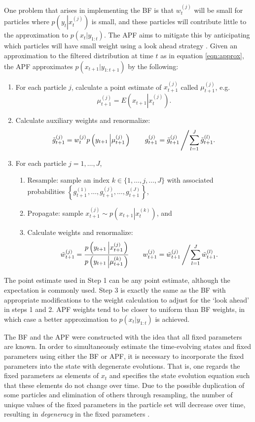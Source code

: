 One problem that arises in implementing the BF is that $w_t^{(j)}$ will be small for particles where $p\left(y_{t}\left|x_{t}^{(j)}\right.\right)$ is small, and these particles will contribute little to the approximation to $p(x_{t}|y_{1:t})$. The APF aims to mitigate this by anticipating which particles will have small weight using a look ahead strategy \citep{Pitt:Shep:filt:1999}. Given an approximation to the filtered distribution at time $t$ as in equation \eqref{eqn:approx}, the APF approximates $p(x_{t+1}|y_{1:t+1})$ by the following:
\begin{enumerate}
\item For each particle $j$, calculate a point estimate of $x_{t+1}^{(j)}$ called $\mu_{t+1}^{(j)}$, e.g.
\[ \mu_{t+1}^{(j)} = E\left(x_{t+1}\left|x_t^{(j)} \right.\right). \]
\item Calculate auxiliary weights and renormalize:
\[ \tilde{g}_{t+1}^{(j)} = w_t^{(j)} p\left(y_{t+1}\left|\mu_{t+1}^{(j)}\right.\right) \qquad g_{t+1}^{(j)} = \tilde{g}_{t+1}^{(j)}\left/\sum_{l=1}^J \tilde{g}_{t+1}^{(l)}.\right. \]
\item For each particle $j=1,\ldots,J$,
	\begin{enumerate}
    \item Resample: sample an index $k\in\{1,\ldots,j,\ldots,J\}$ with associated probabilities $\left\{g_{t+1}^{(1)},\ldots,g_{t+1}^{(j)},\ldots,g_{t+1}^{(J)}\right\}$,
	\item Propagate: sample $x_{t+1}^{(j)} \sim p\left(x_{t+1}\left|x_t^{(k)}\right.\right)$, and
	\item Calculate weights and renormalize:
\[ \tilde{w}_{t+1}^{(j)} = \frac{p\left(y_{t+1}\left|x_{t+1}^{(j)}\right.\right)}{p\left(y_{t+1}\left|\mu_{t+1}^{(k)}\right.\right)} \qquad w_{t+1}^{(j)} = \tilde{w}_{t+1}^{(j)}\left/\sum_{l=1}^J \tilde{w}_{t+1}^{(l)}. \right. \]
	\end{enumerate}
\end{enumerate}
The point estimate used in Step 1 can be any point estimate, although the expectation is commonly used. Step 3 is exactly the same as the BF with appropriate modifications to the weight calculation to adjust for the `look ahead' in steps 1 and 2. APF weights tend to be closer to uniform than BF weights, in which case a better approximation to $p(x_{t}|y_{1:t})$ is achieved.

The BF and the APF were constructed with the idea that all fixed parameters are known. In order to simultaneously estimate the time-evolving states and fixed parameters using either the BF or APF, it is necessary to incorporate the fixed parameters into the state with degenerate evolutions. That is, one regards the fixed parameters as elements of $x_t$ and specifies the state evolution equation such that these elements do not change over time. Due to the possible duplication of some particles and elimination of others through resampling, the number of unique values of the fixed parameters in the particle set will decrease over time, resulting in \emph{degeneracy} in the fixed parameters \citep{Liu:West:comb:2001}.

